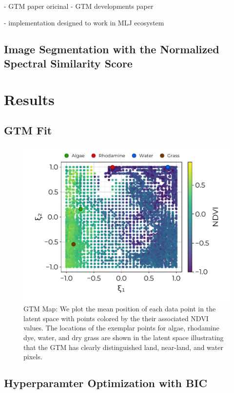 \documentclass[remotesensing,article,submit,pdftex,moreauthors]{Definitions/mdpi}
\begin{document}
- GTM paper oricinal \cite{gtm-bishop-1}
- GTM developments paper \cite{gtm-biship-2}

- implementation designed to work in MLJ ecosystem \cite{blaom2020mlj}


\subsection{Image Segmentation with the Normalized Spectral Similarity Score}

\section{Results}

\subsection{GTM Fit}

\begin{figure}[t]
\centering
\includegraphics[width=0.8\columnwidth]{paper/figures/results/square-ndvi.pdf}
\caption{GTM Map: We plot the mean position of each data point in the latent space with points colored by the their associated NDVI values. The locations of the exemplar points for algae, rhodamine dye, water, and dry grass are shown in the latent space illustrating that the GTM has clearly distinguished land, near-land, and water pixels.\label{fig:}}
\end{figure}  


\subsection{Hyperparamter Optimization with BIC}
\end{document}
